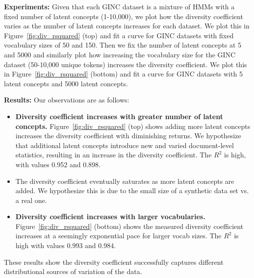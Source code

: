\textbf{Experiments:}
Given that each GINC dataset is a mixture of HMMs with a fixed number of latent concepts (1-10,000), we plot how the diversity coefficient varies as the number of latent concepts increases for each dataset.
We plot this in Figure~\ref{fig:div_rsquared} (top) and fit a curve for GINC datasets with fixed vocabulary sizes of 50 and 150.
Then we fix the number of latent concepts at 5 and 5000 and similarly plot how increasing the vocabulary size for the GINC dataset (50-10,000 unique tokens) increases the diversity coefficient.
We plot this in Figure~\ref{fig:div_rsquared} (bottom) and fit a curve for GINC datasets with 5 latent concepts and 5000 latent concepts.

\textbf{Results:}
Our observations are as follows:
\begin{itemize}
    \item \textbf{Diversity coefficient increases with greater number of latent concepts.} 
    Figure~\ref{fig:div_rsquared} (top) shows adding more latent concepts increases the diversity coefficient with diminishing returns.
    We hypothesize that additional latent concepts introduce new and varied document-level statistics, resulting in an increase in the diversity coefficient.
    The $R^2$ is high, with values 0.952 and 0.898.
    \item The diversity coefficient eventually saturates as more latent concepts are added. 
    We hypothesize this is due to the small size of a synthetic data set vs. a real one.
    \item \textbf{Diversity coefficient increases with larger vocabularies.}
    Figure~\ref{fig:div_rsquared} (bottom) shows the measured diversity coefficient increases at a seemingly exponential pace for larger vocab sizes.
    The $R^2$ is high with values 0.993 and 0.984.
\end{itemize}
These results show the diversity coefficient successfully captures different distributional sources of variation of the data.

